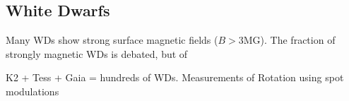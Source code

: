 {\color{red} \subsection{White Dwarfs}}
Many WDs show strong surface magnetic fields ($B>$3MG). The fraction of strongly magnetic WDs is debated, but of  

K2 + Tess + Gaia = hundreds of WDs. Measurements of Rotation using spot modulations